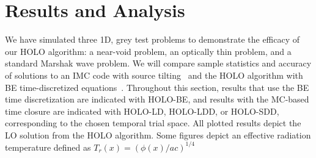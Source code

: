 \documentclass{anstrans}
\begin{document}
\section{Results and Analysis}

We have simulated three 1D, grey test problems to demonstrate the efficacy of our HOLO
algorithm: a near-void problem, an optically thin problem, and a standard Marshak wave problem.
We will compare sample statistics and accuracy of solutions to an IMC code with
source tilting~\cite{jayenne} and the HOLO algorithm with BE time-discretized
equations~\cite{bolding_nse}. Throughout this section, results that use the
BE time discretization are indicated with HOLO-BE, and results with the MC-based time
closure are indicated with HOLO-LD, HOLO-LDD, or HOLO-SDD, corresponding to the chosen temporal trial space. 
All plotted results depict the LO solution from the HOLO algorithm.  Some figures depict an
effective radiation temperature defined as $T_{r}(x) = \left(\phi(x)/ac\right)^{1/4}$
\end{document}
